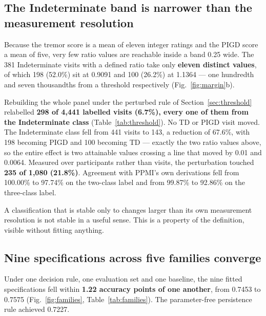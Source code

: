\documentclass[journal]{IEEEtran}
\begin{document}
\subsection{The Indeterminate band is narrower than the measurement resolution}

Because the tremor score is a mean of eleven integer ratings and the PIGD score
a mean of five, very few ratio values are reachable inside a band 0.25 wide. The
381 Indeterminate visits with a defined ratio take only \textbf{eleven distinct
values}, of which 198 (52.0\%) sit at 0.9091 and 100 (26.2\%) at 1.1364 --- one
hundredth and seven thousandths from a threshold respectively
(Fig.~\ref{fig:margin}b).

Rebuilding the whole panel under the perturbed rule of
Section~\ref{sec:threshold} relabelled \textbf{298 of 4,441 labelled visits
(6.7\%), every one of them from the Indeterminate class}
(Table~\ref{tab:threshold}). No TD or PIGD visit moved. The Indeterminate class
fell from 441 visits to 143, a reduction of 67.6\%, with 198 becoming PIGD and
100 becoming TD --- exactly the two ratio values above, so the entire effect is
two attainable values crossing a line that moved by 0.01 and 0.0064. Measured
over participants rather than visits, the perturbation touched \textbf{235 of
1,080 (21.8\%)}. Agreement with PPMI's own derivations fell from 100.00\% to
97.74\% on the two-class label and from 99.87\% to 92.86\% on the three-class
label.

\begin{table}[!t]
\centering
\caption{Labels under the primary rule against the perturbed rule, over all
4,441 labelled visits. The off-diagonal is confined to one row.}
\label{tab:threshold}
\small

\end{table}

A classification that is stable only to changes larger than its own measurement
resolution is not stable in a useful sense. This is a property of the
definition, visible without fitting anything.

\subsection{Nine specifications across five families converge}

Under one decision rule, one evaluation set and one baseline, the nine fitted
specifications fell within \textbf{1.22 accuracy points of one another}, from
0.7453 to 0.7575 (Fig.~\ref{fig:families}, Table~\ref{tab:families}). The
parameter-free persistence rule achieved 0.7227.
\end{document}
